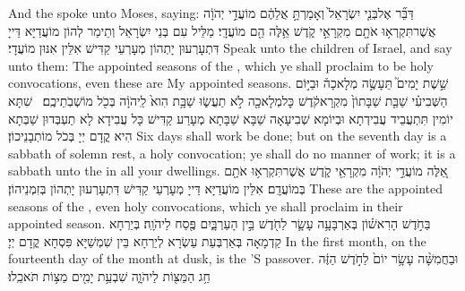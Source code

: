 {And the \lord\space spoke unto Moses, saying:}{}
{דַּבֵּ֞ר אֶל\maqqaf בְּנֵ֤י יִשְׂרָאֵל֙ וְאָמַרְתָּ֣ אֲלֵהֶ֔ם מוֹעֲדֵ֣י יְהֹוָ֔ה אֲשֶׁר\maqqaf תִּקְרְא֥וּ אֹתָ֖ם מִקְרָאֵ֣י קֹ֑דֶשׁ אֵ֥לֶּה הֵ֖ם מוֹעֲדָֽי׃}
{מַלֵּיל עִם בְּנֵי יִשְׂרָאֵל וְתֵימַר לְהוֹן מוֹעֲדַיָּא דַּייָ דִּתְעָרְעוּן יָתְהוֹן מְעָרְעֵי קַדִּישׁ אִלֵּין אִנּוּן מוֹעֲדָי׃}
{Speak unto the children of Israel, and say unto them: The appointed seasons of the \lord, which ye shall proclaim to be holy convocations, even these are My appointed seasons.}{}
{שֵׁ֣שֶׁת יָמִים֮ תֵּעָשֶׂ֣ה מְלָאכָה֒ וּבַיּ֣וֹם הַשְּׁבִיעִ֗י שַׁבַּ֤ת שַׁבָּתוֹן֙ מִקְרָא\maqqaf קֹ֔דֶשׁ כׇּל\maqqaf מְלָאכָ֖ה לֹ֣א תַעֲשׂ֑וּ שַׁבָּ֥ת הִוא֙ לַֽיהֹוָ֔ה בְּכֹ֖ל מוֹשְׁבֹֽתֵיכֶֽם׃ \petucha }
{שִׁתָּא יוֹמִין תִּתְעֲבֵיד עֲבִידְתָא וּבְיוֹמָא שְׁבִיעָאָה שַׁבָּא שַׁבָּתָא מְעָרַע קַדִּישׁ כָּל עֲבִידָא לָא תַעְבְּדוּן שַׁבְּתָא הִיא קֳדָם יְיָ בְּכֹל מוֹתְבָנֵיכוֹן׃}
{Six days shall work be done; but on the seventh day is a sabbath of solemn rest, a holy convocation; ye shall do no manner of work; it is a sabbath unto the \lord\space in all your dwellings.}{}
{אֵ֚לֶּה מוֹעֲדֵ֣י יְהֹוָ֔ה מִקְרָאֵ֖י קֹ֑דֶשׁ אֲשֶׁר\maqqaf תִּקְרְא֥וּ אֹתָ֖ם בְּמוֹעֲדָֽם׃}
{אִלֵּין מוֹעֲדַיָּא דַּייָ מְעָרְעֵי קַדִּישׁ דִּתְעָרְעוּן יָתְהוֹן בְּזִמְנֵיהוֹן׃}
{These are the appointed seasons of the \lord, even holy convocations, which ye shall proclaim in their appointed season.}{}
{בַּחֹ֣דֶשׁ הָרִאשׁ֗וֹן בְּאַרְבָּעָ֥ה עָשָׂ֛ר לַחֹ֖דֶשׁ בֵּ֣ין הָעַרְבָּ֑יִם פֶּ֖סַח לַיהֹוָֽה׃}
{בְּיַרְחָא קַדְמָאָה בְּאַרְבְּעַת עַשְׂרָא לְיַרְחָא בֵּין שִׁמְשַׁיָּא פִּסְחָא קֳדָם יְיָ׃}
{In the first month, on the fourteenth day of the month at dusk, is the \lord’S passover.}{}
{וּבַחֲמִשָּׁ֨ה עָשָׂ֥ר יוֹם֙ לַחֹ֣דֶשׁ הַזֶּ֔ה חַ֥ג הַמַּצּ֖וֹת לַיהֹוָ֑ה שִׁבְעַ֥ת יָמִ֖ים מַצּ֥וֹת תֹּאכֵֽלוּ׃}
